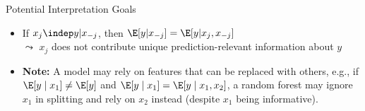\documentclass[11pt,compress,t,notes=noshow, aspectratio=169, xcolor=table]{beamer}
\begin{document}
\begin{frame}{Potential Interpretation Goals}
\begin{enumerate}
\begin{itemize}
      \item If $x_j \indep y | x_{-j}$, then $\E[y|x_{-j}] = \E[y|x_j, x_{-j}]$ \\
      $\leadsto$ $x_j$ does not contribute unique prediction-relevant information about $y$
      \item \textbf{Note:} A model may rely on features that can be replaced with others, e.g., if $\E[y \mid x_1] \neq \E[y]$ and $\E[y \mid x_1] = \E[y \mid x_1, x_2]$, a random forest may ignore $x_1$ in splitting and rely on $x_2$ instead (despite $x_1$ being informative).
    \end{itemize}
\end{enumerate}
\end{frame}





\end{document}
